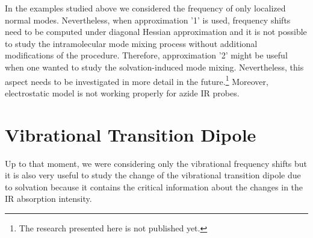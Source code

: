 \documentclass[a4paper,titlepage,twoside,fleqn,12pt]{book}
\begin{document}
\begin{refsection}
In the examples studied above we considered the frequency of only localized 
normal modes. Nevertheless, when approximation '1'
is used, frequency shifts need to be computed under diagonal Hessian approximation
and it is not possible to study the intramolecular mode mixing process without additional 
modifications of the procedure. Therefore, approximation '2' might be useful when one
wanted to study the solvation\hyp{}induced mode mixing. Nevertheless, this aspect needs to
be investigated in more detail in the future.\footnote{The research presented here is not published yet.}
Moreover, electrostatic model is not working properly for azide IR probes.

\section{Vibrational Transition Dipole}

Up to that moment, we were considering only the vibrational frequency shifts
but it is also very useful to study the change of the vibrational
transition dipole due to solvation because it contains the critical
information about the changes in the IR absorption intensity.


\end{refsection}
\end{document}
